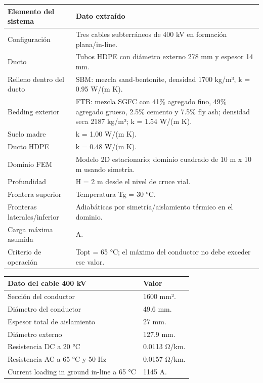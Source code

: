 \documentclass[11pt,a4paper,oneside]{report}
\begin{document}
\begin{longtable}[]{@{}
  >{\raggedright\arraybackslash}p{}
  >{\raggedright\arraybackslash}p{}@{}}
\toprule\noalign{}
\begin{minipage}[b]{\linewidth}\raggedright
Elemento del sistema
\end{minipage} & \begin{minipage}[b]{\linewidth}\raggedright
Dato extraído
\end{minipage} \\
\midrule\noalign{}
\endhead
\bottomrule\noalign{}
\endlastfoot
Configuración & Tres cables subterráneos de 400 kV en formación
plana/in-line. \\
Ducto & Tubos HDPE con diámetro externo 278 mm y espesor 14 mm. \\
Relleno dentro del ducto & SBM: mezcla sand-bentonite, densidad 1700
kg/m³, k = 0.95 W/(m K). \\
Bedding exterior & FTB: mezcla SGFC con 41\% agregado fino, 49\%
agregado grueso, 2.5\% cemento y 7.5\% fly ash; densidad seca 2187
kg/m³; k = 1.54 W/(m K). \\
Suelo madre & k = 1.00 W/(m K). \\
Ducto HDPE & k = 0.48 W/(m K). \\
Dominio FEM & Modelo 2D estacionario; dominio cuadrado de 10 m x 10 m
usando simetría. \\
Profundidad & H = 2 m desde el nivel de cruce vial. \\
Frontera superior & Temperatura Tg = 30 °C. \\
Fronteras laterales/inferior & Adiabáticas por simetría/aislamiento
térmico en el dominio. \\
Carga máxima asumida & 1145 A. \\
Criterio de operación & Topt = 65 °C; el máximo del conductor no debe
exceder ese valor. \\
\end{longtable}

\begin{longtable}[]{@{}ll@{}}
\toprule\noalign{}
Dato del cable 400 kV & Valor \\
\midrule\noalign{}
\endhead
\bottomrule\noalign{}
\endlastfoot
Sección del conductor & 1600 mm². \\
Diámetro del conductor & 49.6 mm. \\
Espesor total de aislamiento & 27 mm. \\
Diámetro externo & 127.9 mm. \\
Resistencia DC a 20 °C & 0.0113 Ω/km. \\
Resistencia AC a 65 °C y 50 Hz & 0.0157 Ω/km. \\
Current loading in ground in-line a 65 °C & 1145 A. \\
\end{longtable}
\end{document}
